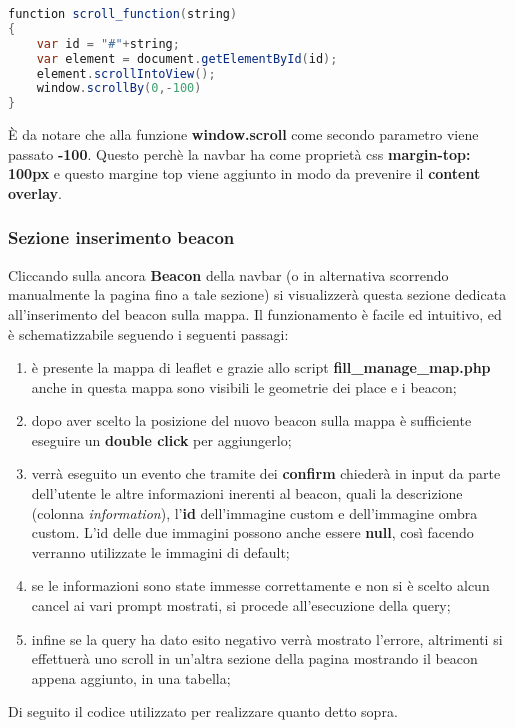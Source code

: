 \begin{lstlisting}[language=Java]
function scroll_function(string)
{
	var id = "#"+string;
	var element = document.getElementById(id);
	element.scrollIntoView();
	window.scrollBy(0,-100)
}
\end{lstlisting}
È da notare che alla funzione \textbf{window.scroll} come secondo parametro viene passato \textbf{-100}. Questo perchè la navbar ha come proprietà css \textbf{margin-top: 100px} e questo margine top viene aggiunto in modo da prevenire il \textbf{content overlay}.

\subsubsection{Sezione inserimento beacon}
Cliccando sulla ancora \textbf{Beacon} della navbar (o in alternativa scorrendo manualmente la pagina fino a tale sezione) si visualizzerà  questa sezione dedicata all'inserimento del beacon sulla mappa. \newline
Il funzionamento è facile ed intuitivo, ed è schematizzabile seguendo i seguenti passagi:
\begin{enumerate}
\item è presente la mappa di leaflet e grazie allo script \textbf{fill\_manage\_map.php} anche in questa mappa sono visibili le geometrie dei place e i beacon;
\item dopo aver scelto la posizione del nuovo beacon sulla mappa è sufficiente eseguire un \textbf{double click} per aggiungerlo;
\item verrà eseguito un evento che tramite dei \textbf{confirm} chiederà in input da parte dell'utente le altre informazioni inerenti al beacon, quali la descrizione (colonna \textit{information}), l'\textbf{id} dell'immagine custom e dell'immagine ombra custom. L'id delle due immagini possono anche essere \textbf{null}, così facendo verranno utilizzate le immagini di default;
\item se le informazioni sono state immesse correttamente e non si è scelto alcun cancel ai vari prompt mostrati, si procede all'esecuzione della query;
\item infine se la query ha dato esito negativo verrà mostrato l'errore, altrimenti si effettuerà uno scroll in un'altra sezione della pagina mostrando il beacon appena aggiunto, in una tabella;
\end{enumerate}
Di seguito il codice utilizzato per realizzare quanto detto sopra.
